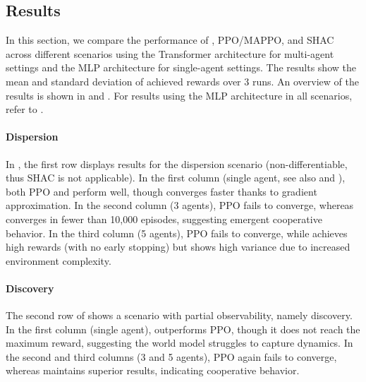 \subsection{Results}

In this section, we compare the performance of \fname{}, PPO/MAPPO, and SHAC across different scenarios using the Transformer architecture for multi-agent settings and the MLP architecture for single-agent settings. The results show the mean and standard deviation of achieved rewards over 3 runs. An overview of the results is shown in  and . For results using the MLP architecture in all scenarios, refer to .

\paragraph{Dispersion}
In , the first row displays results for the dispersion scenario (non-differentiable, thus SHAC is not applicable). In the first column (single agent, see also  and ), both PPO and \fname{} perform well, though \fname{} converges faster thanks to gradient approximation. In the second column (3 agents), PPO fails to converge, whereas \fname{} converges in fewer than 10,000 episodes, suggesting emergent cooperative behavior. In the third column (5 agents), PPO fails to converge, while \fname{} achieves high rewards (with no early stopping) but shows high variance due to increased environment complexity.

\paragraph{Discovery} 
The second row of  shows a scenario with partial observability, namely discovery. In the first column (single agent), \fname{} outperforms PPO, though it does not reach the maximum reward, suggesting the world model struggles to capture dynamics. In the second and third columns (3 and 5 agents), PPO again fails to converge, whereas \fname{} maintains superior results, indicating cooperative behavior.

